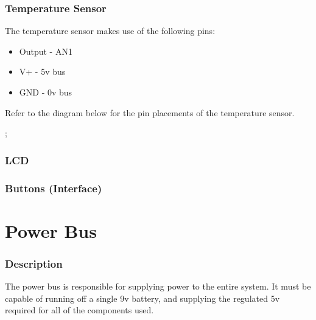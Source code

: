 \documentclass[]{report}
\begin{document}
\subsection{Temperature Sensor}
The temperature sensor makes use of the following pins:
\begin{itemize}
	\item Output - AN1 
	\item V+ - 5v bus
	\item GND - 0v bus
\end{itemize}
Refer to the diagram below for the pin placements of the temperature sensor.

;
\label{TempSensorPins}


\subsection{LCD}

\subsection{Buttons (Interface)}

\chapter{Power Bus}
\subsection{Description}
The power bus is responsible for supplying power to the entire system. It must be capable of running off a single 9v battery, and supplying the regulated 5v required for all of the components used.
\end{document}
